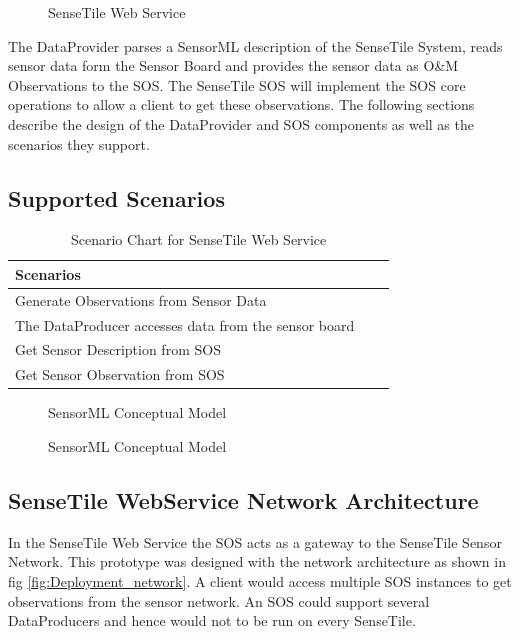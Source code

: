 \documentclass[]{final_report}
\begin{document}
\begin{figure}[h]
\caption{SenseTile Web Service}\label{fig:Deployment_sensetile}
\end{figure}

The DataProvider parses a SensorML description of the SenseTile System, reads sensor data form the Sensor Board and provides the sensor data as O\&M Observations to the SOS. The SenseTile SOS will implement the SOS core operations to allow a client to get these observations. The following sections describe the design of the DataProvider and SOS components as well as the scenarios they support.

\subsection{Supported Scenarios}
\begin{table}[!th]
\begin{tabular}{|l|c|r|}
\hline
Scenarios\\
\hline
Generate Observations from Sensor Data \\
The DataProducer accesses data from the sensor board \\
\hline
Get Sensor Description from SOS\\
\hline
Get  Sensor Observation from SOS\\
\hline
\end{tabular}
\caption{Scenario Chart for SenseTile Web Service}
\label{ex:table}
\end{table}
\begin{figure}[h]
\caption{SensorML Conceptual Model}\label{fig:InsertObs}
\end{figure}

\begin{figure}[h]
\caption{SensorML Conceptual Model}\label{fig:GetObs}
\end{figure}
\newpage
\subsection{SenseTile WebService Network Architecture}
\label{subsec:SenseTile WebService Network Architecture}
In the SenseTile Web Service the SOS acts as a gateway to the SenseTile Sensor Network. This prototype was designed with the network architecture as shown in fig \ref{fig:Deployment_network}. A client would access multiple SOS instances to get observations from the sensor network. An SOS could support several DataProducers and hence would not to be run on every SenseTile. 
\end{document}
